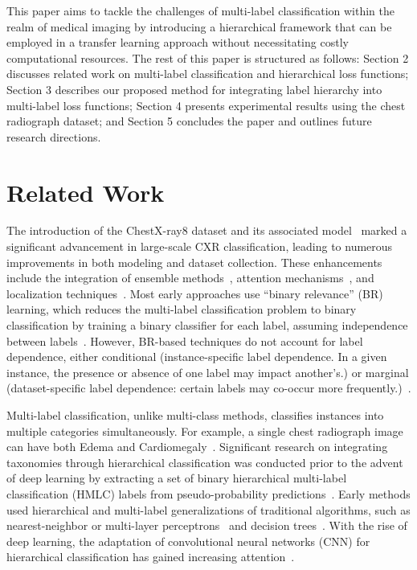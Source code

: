 \documentclass[preprint,3p,times, review]{elsarticle}
\begin{document}
This paper aims to tackle the challenges of multi-label classification within the realm of medical imaging by introducing a hierarchical framework that can be employed in a transfer learning approach without necessitating costly computational resources. The rest of this paper is structured as follows: Section 2 discusses related work on multi-label classification and hierarchical loss functions; Section 3 describes our proposed method for integrating label hierarchy into multi-label loss functions; Section 4 presents experimental results using the chest radiograph dataset; and Section 5 concludes the paper and outlines future research directions.

\section{Related Work}

The introduction of the ChestX-ray8 dataset and its associated model~\cite{1902693:27875825} marked a significant advancement in large-scale CXR classification, leading to numerous improvements in both modeling and dataset collection. These enhancements include the integration of ensemble methods~\cite{1902693:27875861}, attention mechanisms~\cite{1902693:27875862,1902693:27875824}, and localization techniques~\cite{1902693:27875854,1902693:27875830,1902693:27875823,1902693:27875855}. Most early approaches use ``binary relevance'' (BR) learning, which reduces the multi-label classification problem to binary classification by training a binary classifier for each label, assuming independence between labels~\cite{1902693:27875834}. However, BR-based techniques do not account for label dependence, either conditional (instance-specific label dependence. In a given instance, the presence or absence of one label may impact another's.) or marginal (dataset-specific label dependence: certain labels may co-occur more frequently.)~\cite{1902693:27875838}.

Multi-label classification, unlike multi-class methods, classifies instances into multiple categories simultaneously. For example, a single chest radiograph image can have both Edema and Cardiomegaly~\cite{1902693:27875837,1902693:27875832}. Significant research on integrating taxonomies through hierarchical classification was conducted prior to the advent of deep learning by extracting a set of binary hierarchical multi-label classification (HMLC) labels from pseudo-probability predictions~\cite{1902693:27875843}. Early methods used hierarchical and multi-label generalizations of traditional algorithms, such as nearest-neighbor or multi-layer perceptrons~\cite{1902693:27875853} and decision trees~\cite{1902693:27875856}. With the rise of deep learning, the adaptation of convolutional neural networks (CNN) for hierarchical classification has gained increasing attention~\cite{1902693:27875822,1902693:27875852,1902693:27875827,1902693:27875846}.
\end{document}
